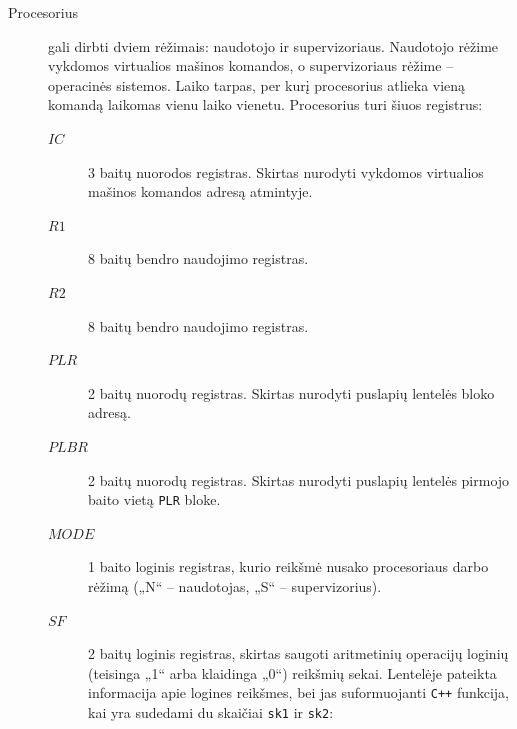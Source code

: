 \begin{description}
  \item[Procesorius] gali dirbti dviem rėžimais: naudotojo ir 
    supervizoriaus. Naudotojo rėžime vykdomos virtualios mašinos komandos,
    o supervizoriaus rėžime – operacinės sistemos. Laiko tarpas, per
    kurį procesorius atlieka vieną komandą laikomas vienu laiko vienetu.
    Procesorius turi šiuos registrus:
    \begin{description}
      \item[$IC$] 3 baitų nuorodos registras. Skirtas nurodyti vykdomos 
        virtualios mašinos komandos adresą atmintyje.
      \item[$R1$] 8 baitų bendro naudojimo registras.
      \item[$R2$] 8 baitų bendro naudojimo registras.
      \item[$PLR$] 2 baitų nuorodų registras. Skirtas nurodyti puslapių 
        lentelės bloko adresą.
      \item[$PLBR$] 2 baitų nuorodų registras. Skirtas nurodyti puslapių 
        lentelės pirmojo baito vietą \verb|PLR| bloke.
      \item[$MODE$] 1 baito loginis registras, kurio reikšmė nusako 
        procesoriaus darbo rėžimą („N“ – naudotojas, „S“ – supervizorius).
      \item[$SF$] 2 baitų loginis registras, skirtas saugoti aritmetinių 
        operacijų loginių (teisinga „1“ arba klaidinga „0“) reikšmių sekai. 
        Lentelėje pateikta informacija apie logines reikšmes, bei jas 
        suformuojanti \verb|C++| funkcija, kai yra sudedami du skaičiai 
        \verb|sk1| ir \verb|sk2|:


\end{description}
\end{description}
